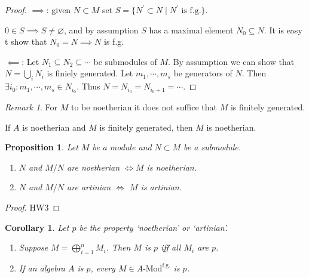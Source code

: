 \documentclass{article}
\theoremstyle{definition}
\theoremstyle{plain}
\newtheorem{proposition}[theorem]{Proposition}
\newtheorem{corollary}[theorem]{Corollary}
\theoremstyle{remark}
\newtheorem*{remark*}{Remark}
\begin{document}
    \begin{proof}
        \(\implies\): given \(N \subset M\) set \(S = \{ N^{\prime} \subset N \mid N^{\prime} \text{ is f.g.} \} \).

        \(0 \in S \implies S \neq \varnothing\), and by assumption \(S\) has a maximal element \(N_0 \subseteq N\). It is easy t show that \(N_0 = N \implies N\) is f.g.

        \(\impliedby\): Let \(N_1 \subseteq N_2 \subseteq \cdots\) be submodules of \(M\). By assumption we can show that \(N = \bigcup_{i} N_i\) is finiely generated. Let \(m_1 , \cdots , m_s\) be generators of \(N\). Then \(\exists i_0: m_1 , \cdots , m_s \in N_{i_0}\). Thus \(N = N_{i_0} = N_{i_0 + 1} = \cdots\). 
    \end{proof}

    \begin{remark*}
        For \(M\) to be noetherian it does not suffice that \(M\) is finitely generated.

        If \(A\) is noetherian and \(M\) is finitely generated, then \(M\) is noetherian.
    \end{remark*}

    \begin{proposition}
        Let \(M\) be a module and \(N \subset M\) be a submodule.

        \begin{enumerate}[label=\roman*)]
            \item \(N\) and \(M / N\) are noetherian \(\iff M\) is noetherian.
            \item \(N\) and \(M / N\) are artinian \(\iff\) \(M\) is artinian. 
        \end{enumerate} 
    \end{proposition}

    \begin{proof}
        HW3
    \end{proof}

    \begin{corollary}
        Let \(p\) be the property `noetherian' or `artinian'. 

        \begin{enumerate}[label=\roman*)]
            \item Suppose \(M = \bigoplus_{i=1}^n M_i\). Then \(M\) is \(p\) iff all \(M_i\) are \(p\).
            \item If an algebra \(A\) is \(p\), every \(M \in A\text{-Mod}^{\text{f.g.}}\) is \(p\).
        \end{enumerate} 
    \end{corollary}
\end{document}

